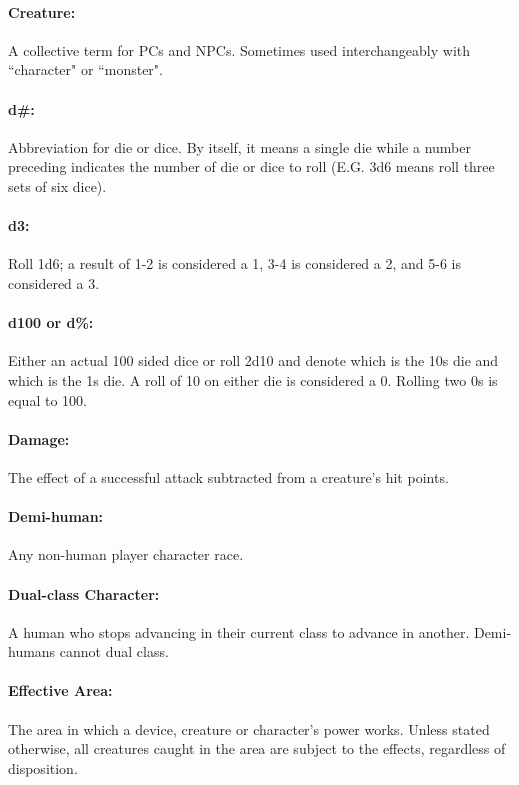 \begin{multicols}{2}
\paragraph{Creature:} A collective term for PCs and NPCs.  Sometimes used interchangeably with ``character" or ``monster".

\paragraph{d\#:}  Abbreviation for die or dice.  By itself, it means a single die while a number preceding indicates the number of die or dice to roll (E.G. 3d6 means roll three sets of six dice).

\paragraph{d3:}  Roll 1d6; a result of 1-2 is considered a 1, 3-4 is considered a 2, and 5-6 is considered a 3.

\paragraph{d100 or d\%:}  Either an actual 100 sided dice or roll 2d10 and denote which is the 10s die and which is the 1s die.  A roll of 10 on either die is considered a 0.  Rolling two 0s is equal to 100.

\paragraph{Damage:} The effect of a successful attack subtracted from a creature's hit points.

\paragraph{Demi-human:} Any non-human player character race.  

\paragraph{Dual-class Character:} A human who stops advancing in their current class to advance in another. Demi-humans cannot dual class.

\paragraph{Effective Area:} The area in which a device, creature or character's power works.  Unless stated otherwise, all creatures caught in the area are subject to the effects, regardless of disposition.


\end{multicols}
